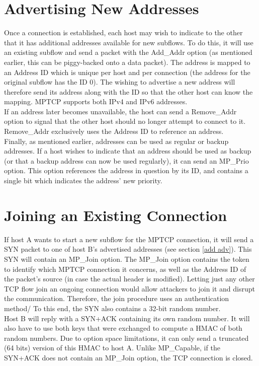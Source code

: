 \section{Advertising New Addresses}
Once a connection is established, each host may wish to indicate to the other that it has additional addresses available for new subflows. To do this, it will use an existing subflow and send a packet with the Add\_Addr option (as mentioned earlier, this can be piggy-backed onto a data packet). The address is mapped to an Address ID which is unique per host and per connection (the address for the original subflow has the ID 0). The wishing to advertise a new address will therefore send its address along with the ID so that the other host can know the mapping. MPTCP supports both IPv4 and IPv6 addresses. \\

If an address later becomes unavailable, the host can send a Remove\_Addr option to signal that the other host should no longer attempt to connect to it. Remove\_Addr exclusively uses the Address ID to reference an address. \\

Finally, as mentioned earlier, addresses can be used as regular or backup addresses. If a host wishes to indicate that an address should be used as backup (or that a backup address can now be used regularly), it can send an MP\_Prio option. This option references the address in question by its ID, and contains a single bit which indicates the address' new priority.

\section{Joining an Existing Connection}
If host A wants to start a new subflow for the MPTCP connection, it will send a SYN packet to one of host B's advertised addresses (see section \ref{add adv}). This SYN will contain an MP\_Join option. The MP\_Join option contains the token to identify which MPTCP connection it concerns, as well as the Address ID of the packet's source (in case the actual header is modified). Letting just any other TCP flow join an ongoing connection would allow attackers to join it and disrupt the communication. Therefore, the join procedure uses an authentication method/ To this end, the SYN also contains a 32-bit random number. \\

Host B will reply with a SYN+ACK containing its own random number. It will also have to use both keys that were exchanged to compute a HMAC of both random numbers. Due to option space limitations, it can only send a truncated (64 bits) version of this HMAC to host A. Unlike MP\_Capable, if the SYN+ACK does not contain an MP\_Join option, the TCP connection is closed. \\

